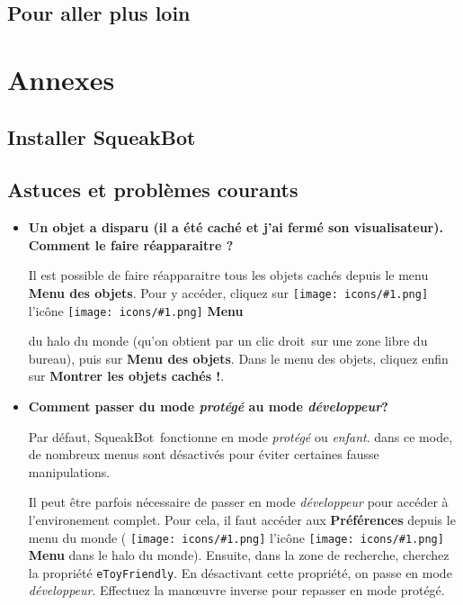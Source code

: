 \documentclass[a4paper,12pt]{book}
\def\appName{SqueakBot}
\def\cd{clic droit~}
\newcommand{\code}[1]{\texttt{#1}}
\newcommand{\important}[1]{\textbf{#1}}
\newcommand{\inserticon}[1]
{
\texttt{[image: icons/\#1.png]}
}
\newcommand{\icon}[2][]
{
\ifthenelse {\equal{#1} {}} {\inserticon{#2}} {l'icône \inserticon{#2} \important{#1}}
}
\begin{document}
\section{Pour aller plus loin}
\chapter{Annexes}

\section{Installer \appName}

\section{Astuces et problèmes courants}

\begin{itemize}
	\item {\bf Un objet a disparu (il a été caché et j'ai fermé son
	visualisateur). Comment le faire réapparaitre ?}

	Il est possible de faire réapparaitre tous les objets cachés depuis le menu
	\important{Menu des objets}. Pour y accéder, cliquez sur \icon[Menu]{menu}
	du halo du monde (qu'on obtient par un \cd sur une zone libre du bureau),
	puis sur \important{Menu des objets}. Dans le menu des objets, cliquez
	enfin sur \important{Montrer les objets cachés !}.

    \item {\bf Comment passer du mode \emph{protégé} au mode \emph{développeur}?}

	Par défaut, \appName~fonctionne en mode \emph{protégé} ou \emph{enfant}. dans
	ce mode, de nombreux menus sont désactivés pour éviter certaines fausse
	manipulations.
	
	Il peut être parfois nécessaire de passer en mode \emph{développeur} pour
	accéder à l'environement complet. Pour cela, il faut accéder aux
	\important{Préférences} depuis le menu du monde (\icon[Menu]{menu} dans le
	halo du monde). Ensuite, dans la zone de recherche, cherchez la propriété
	\code{eToyFriendly}. En désactivant cette propriété, on passe en mode \emph{
	développeur}. Effectuez la man\oe uvre inverse pour repasser en mode
	protégé.  
	
	\end{itemize}
\end{document}
